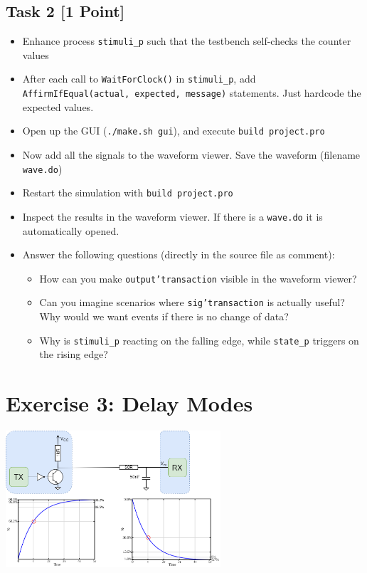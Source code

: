 \documentclass[12pt,epsf,makeidx,oneside]{book}
\begin{document}
\subsection{Task 2 [1 Point]}
\begin{itemize}[noitemsep]
  \item Enhance process {\tt stimuli\_p} such that the testbench self-checks the counter values
  \item After each call to {\tt WaitForClock()} in {\tt stimuli\_p}, add {\tt AffirmIfEqual(actual, expected, message)} statements. Just hardcode the expected values.
  \item Open up the GUI ({\tt ./make.sh gui}), and execute {\tt build project.pro}
  \item Now add all the signals to the waveform viewer. Save the waveform (filename {\tt wave.do})
  \item Restart the simulation with {\tt build project.pro}
  \item Inspect the results in the waveform viewer. If there is a {\tt wave.do} it is automatically opened.
  \item Answer the following questions (directly in the source file as comment):
  \begin{itemize}[noitemsep]
    \item How can you make {\tt output'transaction} visible in the waveform viewer?
    \item Can you imagine scenarios where {\tt sig'transaction} is actually useful? Why would we want events if there is no change of data?
    \item Why is {\tt stimuli\_p} reacting on the falling edge, while {\tt state\_p} triggers on the rising edge?
  \end{itemize}
\end{itemize}

\section{Exercise 3: Delay Modes}
\begin{center}
  \includegraphics[width=0.6\textwidth]{transmission}
\end{center}
\end{document}
